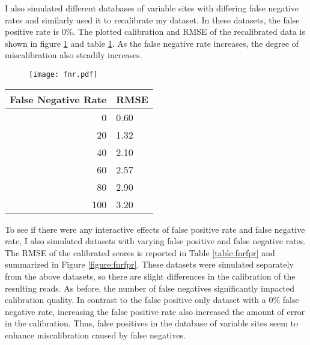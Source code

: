 I also simulated different databases of variable sites with differing false negative rates and similarly used it to recalibrate my dataset. In these datasets, the false positive rate is 0\%. The plotted calibration and RMSE of the recalibrated data is shown in figure \ref{figure:fnr} and table \ref{table:fnr}. As the false negative rate increases, the degree of miscalibration also steadily increases.

\begin{figure}
	\centering
	\texttt{[image: fnr.pdf]}
	\label{figure:fnr}
\end{figure}

\begin{table}
\centering
\begin{tabular}{r l}
\toprule
False Negative Rate & RMSE \\
\midrule
0 & 0.60 \\
20 & 1.32 \\
40 & 2.10 \\
60 & 2.57 \\
80 & 2.90 \\
100 & 3.20 \\
\bottomrule
\end{tabular}
\label{table:fnr}
\end{table}

To see if there were any interactive effects of false positive rate and false negative rate, I also simulated datasets with varying false positive and false negative rates. The RMSE of the calibrated scores is reported in Table \ref{table:fnrfpr} and summarized in Figure \ref{figure:fnrfpr}. These datasets were simulated separately from the above datasets, so there are slight differences in the calibration of the resulting reads.
As before, the number of false negatives significantly impacted calibration quality. In contrast to the false positive only dataset with a 0\% false negative rate, increasing the false positive rate also increased the amount of error in the calibration. Thus, false positives in the database of variable sites seem to enhance miscalibration caused by false negatives.

